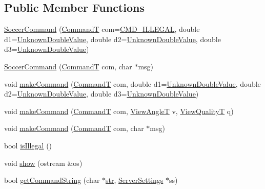 \subsection*{Public Member Functions}
\begin{DoxyCompactItemize}
\item 
\hyperlink{classSoccerCommand_a504b9e27516b21fbd1e1381bd3f8b7b7}{Soccer\+Command} (\hyperlink{SoccerTypes_8h_ac986daf8a835e88572b79bcb63f5bbd5}{CommandT} com=\hyperlink{SoccerTypes_8h_ac986daf8a835e88572b79bcb63f5bbd5a38bf205bc1abc83eb30942d4e6511783}{C\+M\+D\+\_\+\+I\+L\+L\+E\+G\+AL}, double d1=\hyperlink{SoccerTypes_8h_ab232b103c74e1770db1120be5bae9be5}{Unknown\+Double\+Value}, double d2=\hyperlink{SoccerTypes_8h_ab232b103c74e1770db1120be5bae9be5}{Unknown\+Double\+Value}, double d3=\hyperlink{SoccerTypes_8h_ab232b103c74e1770db1120be5bae9be5}{Unknown\+Double\+Value})
\item 
\hyperlink{classSoccerCommand_a707aa0d64e79fbb92fa2a7c8980b5f38}{Soccer\+Command} (\hyperlink{SoccerTypes_8h_ac986daf8a835e88572b79bcb63f5bbd5}{CommandT} com, char $\ast$msg)
\item 
void \hyperlink{classSoccerCommand_a9325ca15907c55269c960cdabe8c7f7c}{make\+Command} (\hyperlink{SoccerTypes_8h_ac986daf8a835e88572b79bcb63f5bbd5}{CommandT} com, double d1=\hyperlink{SoccerTypes_8h_ab232b103c74e1770db1120be5bae9be5}{Unknown\+Double\+Value}, double d2=\hyperlink{SoccerTypes_8h_ab232b103c74e1770db1120be5bae9be5}{Unknown\+Double\+Value}, double d3=\hyperlink{SoccerTypes_8h_ab232b103c74e1770db1120be5bae9be5}{Unknown\+Double\+Value})
\item 
void \hyperlink{classSoccerCommand_a5824c426061b3270a803c3f8a38e4612}{make\+Command} (\hyperlink{SoccerTypes_8h_ac986daf8a835e88572b79bcb63f5bbd5}{CommandT} com, \hyperlink{SoccerTypes_8h_ade95094b8e117801bea82ec390cccf64}{View\+AngleT} v, \hyperlink{SoccerTypes_8h_a5ae52e4e8062de90b118eacb03e99906}{View\+QualityT} q)
\item 
void \hyperlink{classSoccerCommand_a99f3fbfbbe55135adf39c7e2e0ab356f}{make\+Command} (\hyperlink{SoccerTypes_8h_ac986daf8a835e88572b79bcb63f5bbd5}{CommandT} com, char $\ast$msg)
\item 
bool \hyperlink{classSoccerCommand_a48545e47ee0e4fd522e14862fa11e9eb}{is\+Illegal} ()
\item 
void \hyperlink{classSoccerCommand_afbd461eec23646e8af1a191e1d320071}{show} (ostream \&os)
\item 
bool \hyperlink{classSoccerCommand_a6db8db66d235145ddb4fad738b7d5600}{get\+Command\+String} (char $\ast$\hyperlink{classSoccerCommand_a0bdfba0e05fdd6a179c6ebeb5bd5c954}{str}, \hyperlink{classServerSettings}{Server\+Settings} $\ast$ss)
\end{DoxyCompactItemize}
